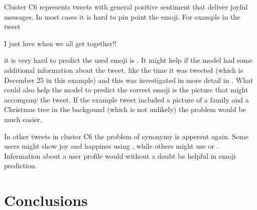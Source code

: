 \documentclass[10pt, a4paper]{article}
\begin{document}
Cluster C6 represents tweets with general positive sentiment that deliver joyful
messages. In most cases it is hard to pin point the emoji. For example in the 
tweet
\begin{displayquote}
I just love when we all get together!! 
\end{displayquote}
it is very hard to predict the used emoji is . It might help if the 
model had some additional information about the tweet, like the time it was 
tweeted (which is December 25 in this example) and this was investigated in more
detail in \citep{barbieri2018exploring}. What could also help the model to 
predict the correct emoji is the picture that might accompany the tweet. If the 
example tweet included a picture of a family and a Christmas tree in the 
backgound (which is not unlikely) the problem would be much easier.

In other tweets in cluster C6 the problem of synonymy is apperent again. Some 
users might show joy and happines using , while others might use
 or . Information about a user profile would without a
doubt be helpful in emoji prediction.

\section{Conclusions}



 
\end{document}
